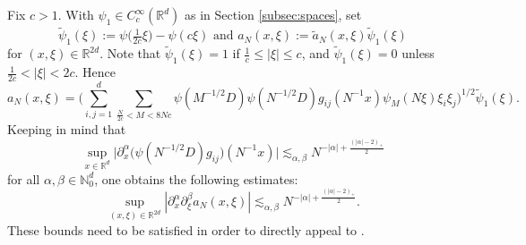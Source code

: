 \documentclass{amsart}
\numberwithin{equation}{section}
\theoremstyle{definition}
\newcommand{\R}{\mathbb{R}}
\newcommand{\Rd}{\mathbb{R}^{d}}
\newcommand{\N}{\mathbb{N}}
\begin{document}
Fix $c>1$. With $\psi_1 \in C^{\infty}_{c}(\Rd)$ as in Section \ref{subsec:spaces}, set%
\begin{equation*}
    \tilde{\psi}_1(\xi):= \psi\big(\tfrac{1}{2c}\xi)-\psi(c\xi)%
    \text{ and } a_N(x,\xi) := \tilde{a}_N(x,\xi) \tilde{\psi}_1(\xi)
\end{equation*}
for $(x,\xi)\in\R^{2d}$. Note that $\tilde{\psi}_{1}(\xi)=1$ if $\frac{1}{c}\leq |\xi|\leq c$, and $\tilde{\psi}_{1}(\xi)=0$ unless $\frac{1}{2c}< |\xi|< 2c$. Hence 
\[
a_N(x,\xi)\!=\!\Big(\!\sum_{i,j=1}^{d}\!\sum_{\frac{N}{2c}<M<8Nc}\!\psi(M^{-1/2}D)\psi(N^{-1/2}D)g_{ij}(N^{-1}x)\psi_{M}(N\xi)\xi_{i}\xi_{j}\!\Big)^{1/2}\tilde{\psi}_{1}(\xi).
\]
Keeping in mind that
\begin{equation}\label{eq:BoundsCoefficientsParadifferential}
\sup_{x\in\Rd}\big|\partial_x^{\alpha} \big(\psi(N^{-1/2}D)g_{ij}\big)(N^{-1}x)\big| \lesssim_{\alpha,\beta} N^{-|\alpha| + \frac{(|\alpha|-2)_+}{2}}
\end{equation}
for all $\alpha,\beta\in \N_{0}^{d}$, one obtains the following estimates:
\begin{equation}\label{eq:SizeRegularitypsharp}
\sup_{(x,\xi)\in\R^{2d}}|\partial_x^{\alpha} \partial_{\xi}^{\beta} a_{N}(x,\xi) | \lesssim_{\alpha,\beta} N^{-|\alpha| + \frac{(|\alpha|-2)_+}{2}}.
\end{equation}
These bounds need to be satisfied in order to directly appeal to \cite[Theorem 1.2]{SchippaTataru2025}. 
\end{document}

